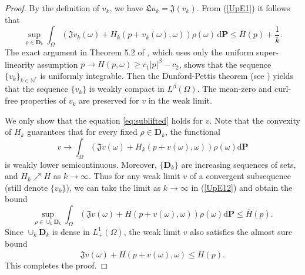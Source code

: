 \documentclass[11pt,reqno]{amsart}
\theoremstyle{definition}
\theoremstyle{remark}
\numberwithin{equation}{section}
\begin{document}
\begin{proof}
By the definition of $v_k$, we have  $\mathfrak{L}u_k = \mathfrak{J}(v_k)$. From (\ref{UpE1}) it follows that
\begin{equation}\label{UpE12}
    \sup_{\rho\in\mathbf{D}_{k}}\int_{\Omega}\left(\mathfrak{J}v_{k} (\omega) + H_{k}(p + v_{k}(\omega), \omega)\right)\rho(\omega)\, \mathrm{d}\mathbf{P} \leq \overline{H}(p) +\frac{1}{k}.
\end{equation}
The exact argument in Theorem 5.2 of \cite{KRV06}, which uses only the uniform super-linearity assumption $p \rightarrow H(p,\omega) \geq c_{1}|p|^{\beta}-c_{2}$, shows that the sequence $\{v_k\}_{k\in \mathbb{N}^*}$ is uniformly integrable. Then the Dunford-Pettis theorem (see \cite[Theorem 4.7.18]{B2006}) yields that the sequence $\{v_{k}\}$ is weakly compact in $L^{\beta}(\Omega)$. The mean-zero and curl-free properties of $v_k$ are preserved for $v$ in the weak limit. %

We only show that the equation \eqref{eq:sublifted} holds for $v$. Note that the convexity of $H_{k}$ guarantees that for every fixed $\rho \in  \mathbf{D}_{k}$, the functional
\begin{equation}
    v \to \int_{\Omega} \left(\mathfrak{J} v (\omega) + H_{k}(p + v(\omega), \omega)\right)\rho(\omega) \mathrm{d}\mathbf{P}
\end{equation}
is weakly lower semicontinuous. Moreover, $\{ \mathbf{D}_{k} \}$ are increasing sequences of sets, and $H_{k} \nearrow H$ as $k \rightarrow \infty$. Thus for any weak limit $v$ of a convergent subsequence (still denote $\{v_{k}\}$), we can take the limit as $k\rightarrow \infty$ in (\ref{UpE12}) and obtain the bound
\begin{equation*}
    \sup_{\rho\in \cup_{k}\mathbf{D}_{k}}\int_{\Omega}(\mathfrak{J}v (\omega) + H(p + v(\omega), \omega))\rho(\omega) \mathrm{d}\mathbf{P} \leq \overline{H}(p).
\end{equation*}
Since $\cup_{k}\mathbf{D}_{k}$ is dense in $L^1_{+}(\Omega)$, the weak limit $v$ also satisfies the almost sure bound  
\begin{equation*}
    \mathfrak{J}v (\omega) + H(p + v(\omega), \omega) \leq \overline{H}(p).
\end{equation*}
This completes the proof.
\end{proof}
\end{document}
